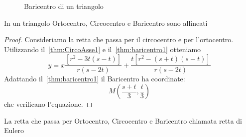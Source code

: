 \begin{figure}
	\centering
	
	\caption{Baricentro di un triangolo}
	\label{fig:baricentro1}
\end{figure}
\begin{thm}\label{thm:eulero1}
In un triangolo Ortocentro, Circocentro e Baricentro sono allineati
\end{thm}
\begin{proof}
	Consideriamo la retta che passa per il circocentro e per l'ortocentro. Utilizzando il~\cref{thm:CircoAsse1} e il~\cref{thm:baricentro1} otteniamo
	\[y=x\dfrac{[r^2-3t(s-t)]}{r(s-2t)}+\dfrac{t[r^2-(s+t)(s-t)]}{r(s-2t)}\]
Adattando il~\cref{thm:baricentro1} il Baricentro ha coordinate: \[M\left(\frac{s+t}{3},\frac{t}{3}\right)\] che verificano l'equazione.
\end{proof}
\begin{defn}\label{defn:rettaEulero1}
La retta che passa per Ortocentro, Circocentro e Baricentro  chiamata retta di Eulero\end{defn}
